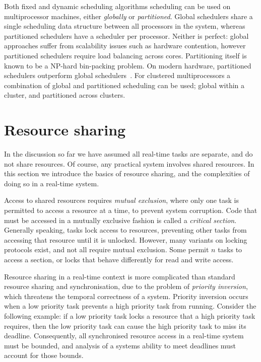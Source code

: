 Both fixed and dynamic scheduling algorithms scheduling can be used on multiprocessor machines, either
\emph{globally} or \emph{partitioned}. Global schedulers share a single scheduling data structure
between all processors in the system, whereas partitioned schedulers have a scheduler per processor.
Neither is perfect: global approaches suffer from scalability issues such as hardware contention,
however partitioned schedulers require load balancing across cores.  Partitioning itself is known to
be a NP-hard bin-packing problem.  On modern hardware, partitioned schedulers outperform global
schedulers~\citep{Brandenburg:phd}.  For clustered multiprocessors a combination of global and
partitioned scheduling can be used; global within a cluster, and partitioned across clusters.

\section{Resource sharing}
\label{sec:resource-sharing-theory}

In the discussion so far we have assumed all real-time tasks are separate, and do not share resources.
Of course, any practical system involves shared resources. In this section we introduce the basics
of resource sharing, and the complexities of doing so in a real-time system.

Access to shared resources requires \emph{mutual exclusion}, where only one 
task is permitted to access a resource at a time, to prevent system corruption. Code that
must be accessed in a mutually exclusive fashion is called a \emph{critical section}. Generally
speaking, tasks lock access to resources, preventing other tasks from accessing that resource
until it is unlocked. However, many variants on locking protocols exist, and not all require mutual 
exclusion. Some permit $n$ tasks to access a section, or locks that behave differently for read and
write access.

Resource sharing in a real-time context is more complicated than standard resource sharing and
synchronisation, due to the problem of \emph{priority inversion}, which threatens the temporal
correctness of a system.  Priority inversion occurs when a low priority task prevents a high
priority task from running.  Consider the following example: if a low priority task locks a resource
that a high priority task requires, then the low priority task can cause the high priority task to
miss its deadline.  Consequently, all synchronised resource access in a real-time system must be
bounded, and analysis of a systems ability to meet deadlines must account for those bounds.

